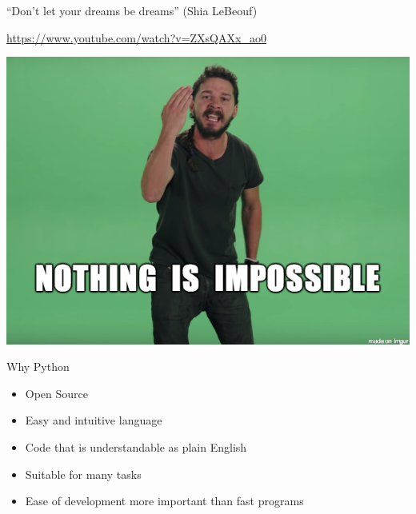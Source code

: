 \documentclass[aspectratio=169,usenames,dvipsnames]{beamer}
\begin{document}
\begin{frame}{``Don't let your dreams be dreams'' (Shia LeBeouf)}
	\begin{reference}
		\url{https://www.youtube.com/watch?v=ZXsQAXx_ao0}
	\end{reference}
   \includegraphics[width=\textwidth]{fig/nothingisimpossible}
\end{frame}




\begin{frame}{Why Python}
    \begin{itemize}
        \item Open Source
        \item Easy and intuitive language
        \item Code that is understandable as plain English
        \item Suitable for many tasks
        \item Ease of development more important than fast programs
    \end{itemize}
\end{frame}
\end{document}
